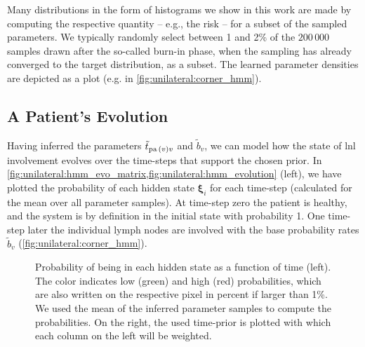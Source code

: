 \documentclass[\relativeRoot/main.tex]{subfiles}
\begin{document}
Many distributions in the form of histograms we show in this work are made by computing the respective quantity -- e.g., the risk -- for a subset of the sampled parameters. We typically randomly select between 1 and 2\% of the $200\,000$ samples drawn after the so-called burn-in phase, when the sampling has already converged to the target distribution, as a subset. The learned parameter densities are depicted as a  \cite{foreman-mackey_cornerpy_2016} plot (e.g. in \cref{fig:unilateral:corner_hmm}).

\subsection{A Patient's Evolution}
\label{subsec:unilateral:application:evolution}

Having inferred the parameters $\tilde{t}_{\operatorname{pa}{(v)}v}$ and $\tilde{b}_v$, we can model how the state of \gls{lnl} involvement evolves over the time-steps that support the chosen prior. In \cref{fig:unilateral:hmm_evo_matrix,fig:unilateral:hmm_evolution} (left), we have plotted the probability of each hidden state $\boldsymbol{\xi}_i$ for each time-step (calculated for the mean over all parameter samples). At time-step zero the patient is healthy, and the system is by definition in the initial state with probability 1. One time-step later the individual lymph nodes are involved with the base probability rates $\tilde{b}_v$ (\cref{fig:unilateral:corner_hmm}).

\begin{figure}
    \centering
    \def\svgwidth{1.0\textwidth}
    
    \caption[Matrix of joint probability of state and time-step]{Probability of being in each hidden state as a function of time (left). The color indicates low (green) and high (red) probabilities, which are also written on the respective pixel in percent if larger than 1\%. We used the mean of the inferred parameter samples to compute the probabilities. On the right, the used time-prior is plotted with which each column on the left will be weighted.}
    \label{fig:unilateral:hmm_evo_matrix}
\end{figure}
\end{document}
